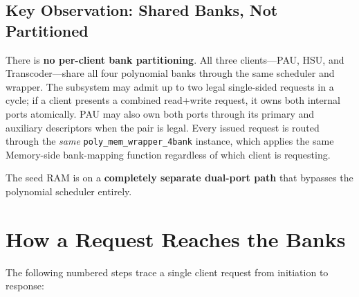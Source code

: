 \documentclass[11pt,letterpaper]{article}
\begin{document}
\subsection{Key Observation: Shared Banks, Not Partitioned}

There is \textbf{no per-client bank partitioning}. All three
clients---PAU, HSU, and Transcoder---share all four polynomial banks
through the same scheduler and wrapper. The subsystem may admit up to two
legal single-sided requests in a cycle; if a client presents a combined
read+write request, it owns both internal ports atomically. PAU may also
own both ports through its primary and auxiliary descriptors when the pair
is legal. Every issued
request is routed through the \emph{same}
\texttt{poly\_mem\_wrapper\_4bank} instance, which applies the same
Memory-side bank-mapping function regardless of which client is requesting.

The seed RAM is on a \textbf{completely separate dual-port path} that
bypasses the polynomial scheduler entirely.

\section{How a Request Reaches the Banks}
\label{sec:datapath}

The following numbered steps trace a single client request from
initiation to response:
\end{document}
